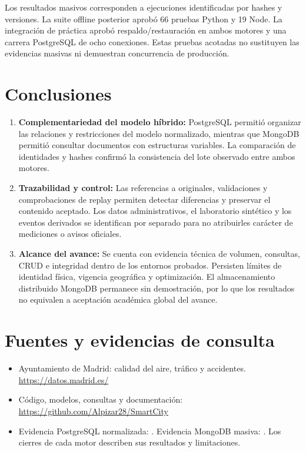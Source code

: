 \documentclass[12pt,letterpaper]{article}
\begin{document}
Los resultados masivos corresponden a ejecuciones identificadas por hashes y
versiones. La suite offline posterior aprobó 66 pruebas Python y 19 Node.
La integración de práctica aprobó respaldo/restauración en ambos motores y una
carrera PostgreSQL de ocho conexiones. Estas pruebas acotadas no sustituyen
las evidencias masivas ni demuestran concurrencia de producción.

\section{Conclusiones}
\begin{enumerate}
    \item \textbf{Complementariedad del modelo híbrido:} PostgreSQL permitió
    organizar las relaciones y restricciones del modelo normalizado, mientras
    que MongoDB permitió consultar documentos con estructuras variables.
    La comparación de identidades y hashes confirmó la consistencia del lote
    observado entre ambos motores.
    \item \textbf{Trazabilidad y control:} Las referencias a originales,
    validaciones y comprobaciones de replay permiten detectar diferencias y
    preservar el contenido aceptado. Los datos administrativos, el laboratorio
    sintético y los eventos derivados se identifican por separado para no
    atribuirles carácter de mediciones o avisos oficiales.
    \item \textbf{Alcance del avance:} Se cuenta con evidencia técnica de
    volumen, consultas, CRUD e integridad dentro de los entornos probados.
    Persisten límites de identidad física, vigencia geográfica y optimización.
    El almacenamiento distribuido MongoDB permanece sin demostración, por lo
    que los resultados no equivalen a aceptación académica global del avance.
\end{enumerate}

\section*{Fuentes y evidencias de consulta}
\begin{itemize}
    \item Ayuntamiento de Madrid: calidad del aire, tráfico y accidentes.
    \url{https://datos.madrid.es/}
    \item Código, modelos, consultas y documentación:
    \url{https://github.com/Alpizar28/SmartCity}
    \item Evidencia PostgreSQL normalizada:
    .
    Evidencia MongoDB masiva:
    .
    Los cierres de cada motor describen sus resultados y limitaciones.
\end{itemize}
\end{document}
